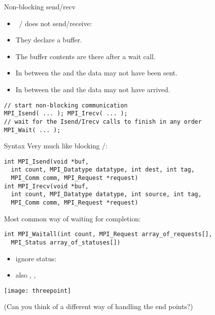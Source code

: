 \begin{numberedframe}{Non-blocking send/recv}
  \begin{itemize}
  \item {}~/  does not send/receive:
  \item They declare a buffer.
  \item The buffer contents are there after a wait call.
  \item In between the  and 
    the data may not have been sent.
  \item In between the  and 
    the data may not have arrived.
  \end{itemize}
\lstset{language=C}
\begin{lstlisting}
// start non-blocking communication
MPI_Isend( ... ); MPI_Irecv( ... );
// wait for the Isend/Irecv calls to finish in any order
MPI_Wait( ... );  
\end{lstlisting}
\end{numberedframe}

\begin{numberedframe}{Syntax}
  \small
  Very much like blocking /:
\lstset{language=C}
\begin{lstlisting}
int MPI_Isend(void *buf,
  int count, MPI_Datatype datatype, int dest, int tag,
  MPI_Comm comm, MPI_Request *request)
int MPI_Irecv(void *buf,
  int count, MPI_Datatype datatype, int source, int tag,
  MPI_Comm comm, MPI_Request *request)  
\end{lstlisting}

Most common way of waiting for completion:
\begin{lstlisting}
int MPI_Waitall(int count, MPI_Request array_of_requests[], 
  MPI_Status array_of_statuses[])
\end{lstlisting}
\begin{itemize}
\item ignore status: 
\item also , , 
\end{itemize}
\end{numberedframe}

\begin{exerciseframe}[isendirecv]
  
  
  \texttt{[image: threepoint]}

  (Can you think of a different way of handling the end points?)
\end{exerciseframe}

